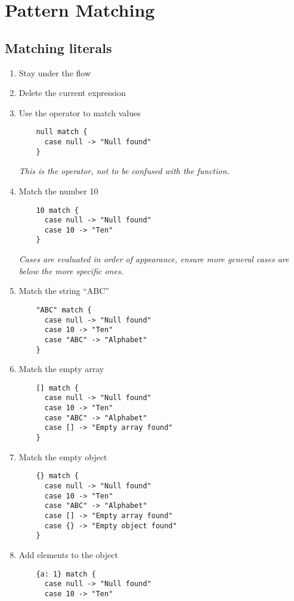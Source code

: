 \section{Pattern Matching}

\subsection{Matching literals}
\begin{enumerate}
\item Stay under the  flow
\item Delete the current expression
\item Use the  operator to match  values
  \begin{verbatim}
    null match {
      case null -> "Null found"
    }
  \end{verbatim}
  \emph{
    This is the  operator, not to be confused with the  function.
  }
\item Match the number 10
  \begin{verbatim}
    10 match {
      case null -> "Null found"
      case 10 -> "Ten"
    }
  \end{verbatim}
  \emph{
    Cases are evaluated in order of appearance, ensure more general cases are below the more specific ones.
  }
\item Match the string ``ABC''
  \begin{verbatim}
    "ABC" match {
      case null -> "Null found"
      case 10 -> "Ten"
      case "ABC" -> "Alphabet"
    }
  \end{verbatim}
\item Match the empty array
  \begin{verbatim}
    [] match {
      case null -> "Null found"
      case 10 -> "Ten"
      case "ABC" -> "Alphabet"
      case [] -> "Empty array found"
    }
  \end{verbatim}
\item Match the empty object
  \begin{verbatim}
    {} match {
      case null -> "Null found"
      case 10 -> "Ten"
      case "ABC" -> "Alphabet"
      case [] -> "Empty array found"
      case {} -> "Empty object found"
    }
  \end{verbatim}
\item Add elements to the object
  \begin{verbatim}
    {a: 1} match {
      case null -> "Null found"
      case 10 -> "Ten"

\end{verbatim}
\end{enumerate}
